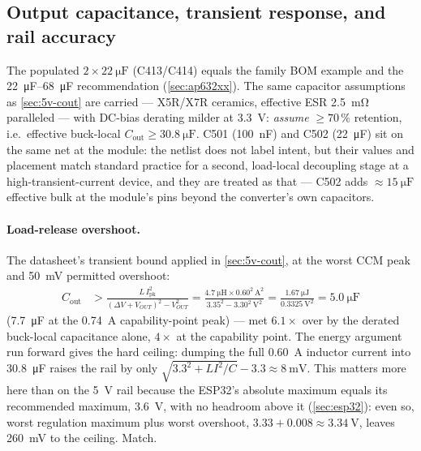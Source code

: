 \subsection{Output capacitance, transient response, and rail accuracy}\label{sec:3v3-cout}

The populated $2\times\SI{22}{\micro\farad}$ (C413/C414) equals the family BOM example
and the \SIrange{22}{68}{\micro\farad} recommendation (\cref{sec:ap632xx}). The same
capacitor assumptions as \cref{sec:5v-cout} are carried --- X5R/X7R ceramics, effective
ESR \SI{2.5}{\milli\ohm} paralleled --- with DC-bias derating milder at 3.3~V:
\emph{assume} $\geq 70\,\%$ retention, i.e.\ effective buck-local
$C_{\mathrm{out}} \geq \SI{30.8}{\micro\farad}$. C501
(\SI{100}{\nano\farad}) and C502 (\SI{22}{\micro\farad}) sit on the same net at the
module: the netlist does not label intent, but their values and placement match standard
practice for a second, load-local decoupling stage at a high-transient-current device,
and they are treated as that --- C502 adds $\approx\SI{15}{\micro\farad}$ effective
bulk at the module's pins beyond the converter's own capacitors.

\paragraph{Load-release overshoot.} The datasheet's transient bound applied in
\cref{sec:5v-cout}, at the worst CCM peak and \SI{50}{\milli\volt} permitted overshoot:
\begin{align*}
  C_{\mathrm{out}} &> \frac{L\,I_{\mathrm{pk}}^2}{(\Delta V + V_{OUT})^2 - V_{OUT}^2}
    = \frac{\SI{4.7}{\micro\henry} \times 0.60^2\,\si{\square\ampere}}
           {3.35^2 - 3.30^2\ \si{\square\volt}}
    = \frac{\SI{1.67}{\micro\joule}}{\SI{0.3325}{\square\volt}}
    = \SI{5.0}{\micro\farad}
\end{align*}
(\SI{7.7}{\micro\farad} at the \SI{0.74}{\ampere} capability-point peak) --- met
$6.1\times$ over by the derated buck-local capacitance alone, $4\times$ at the
capability point. The energy argument run forward gives the hard ceiling: dumping the
full \SI{0.60}{\ampere} inductor current into \SI{30.8}{\micro\farad} raises the rail by
only $\sqrt{3.3^2 + L I^2/C} - 3.3 \approx \SI{8}{\milli\volt}$. This matters more here
than on the 5~V rail because the ESP32's absolute maximum equals its recommended
maximum, \SI{3.6}{\volt}, with no headroom above it (\cref{sec:esp32}): even so, worst
regulation maximum plus worst overshoot, $3.33 + 0.008 \approx \SI{3.34}{\volt}$,
leaves \SI{260}{\milli\volt} to the ceiling. Match.

